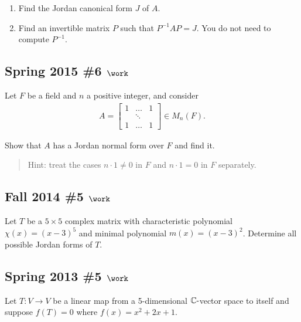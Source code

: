 \begin{enumerate}
\def\labelenumi{\alph{enumi}.}
\item
  Find the Jordan canonical form \(J\) of \(A\).
\item
  Find an invertible matrix \(P\) such that \(P^{-1}A P = J\). You do
  not need to compute \(P^{-1}\).
\end{enumerate}

\hypertarget{spring-2015-6-work}{%
\subsection{\texorpdfstring{Spring 2015 \#6
\(\work\)}{Spring 2015 \#6 \textbackslash work}}\label{spring-2015-6-work}}

Let \(F\) be a field and \(n\) a positive integer, and consider
\begin{align*}
A=\left[\begin{array}{ccc}
1 & \dots & 1 \\
& \ddots & \\
1 & \dots & 1
\end{array}\right] \in M_{n}(F)
.\end{align*}

Show that \(A\) has a Jordan normal form over \(F\) and find it.

\begin{quote}
Hint: treat the cases \(n\cdot 1 \neq 0\) in \(F\) and \(n\cdot 1 = 0\)
in \(F\) separately.
\end{quote}

\hypertarget{fall-2014-5-work}{%
\subsection{\texorpdfstring{Fall 2014 \#5
\(\work\)}{Fall 2014 \#5 \textbackslash work}}\label{fall-2014-5-work}}

Let \(T\) be a \(5\times 5\) complex matrix with characteristic
polynomial \(\chi(x) = (x-3)^5\) and minimal polynomial
\(m(x) = (x-3)^2\). Determine all possible Jordan forms of \(T\).

\hypertarget{spring-2013-5-work}{%
\subsection{\texorpdfstring{Spring 2013 \#5
\(\work\)}{Spring 2013 \#5 \textbackslash work}}\label{spring-2013-5-work}}

Let \(T: V\to V\) be a linear map from a 5-dimensional
\({\mathbb{C}}{\hbox{-}}\)vector space to itself and suppose
\(f(T) = 0\) where \(f(x) = x^2 + 2x + 1\).

